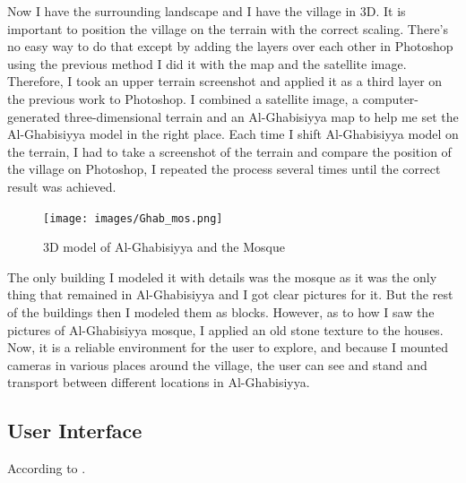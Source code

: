 Now I have the surrounding landscape and I have the village in 3D. It is important to position the village on the terrain with the correct scaling. There's no easy way to do that except by adding the layers over each other in Photoshop using the previous method I did it with the map and the satellite image. Therefore, I took an upper terrain screenshot and applied it as a third layer on the previous work to Photoshop. I combined a satellite image, a computer-generated three-dimensional terrain and an Al-Ghabisiyya map to help me set the Al-Ghabisiyya model in the right place. Each time I shift Al-Ghabisiyya model on the terrain, I had to take a screenshot of the terrain and compare the position of the village on Photoshop, I repeated the process several times until the correct result was achieved. 
\begin{figure}[ht]
    \centering
    \texttt{[image: images/Ghab\_mos.png]}
    \caption{3D model of Al-Ghabisiyya and the Mosque}
    \label{fig:3d}
\end{figure} 
The only building I modeled it with details was the mosque as it was the only thing that remained in Al-Ghabisiyya and I got clear pictures for it. But the rest of the buildings then I modeled them as blocks. However, as to how I saw the pictures of Al-Ghabisiyya mosque, I applied an old stone texture to the houses. Now, it is a reliable environment for the user to explore, and because I mounted cameras in various places around the village, the user can see and stand and transport between different locations in Al-Ghabisiyya.  



\subsection{User Interface}

According to \cite{burdea2017virtual}  \cite [p.69]{burdea2017virtual}. 

